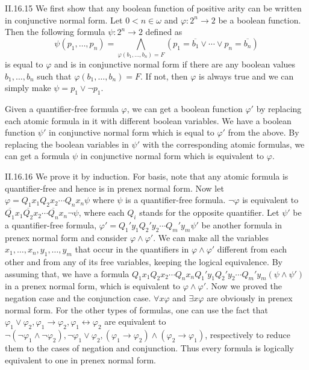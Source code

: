 \documentclass[12pt]{article}
\begin{document}
\begin{customthm}{II.16.15}
  We first show that any boolean function of positive arity can be written in conjunctive normal form. Let $0<n\in\omega$ and $\varphi:2^n\rightarrow 2$ be a boolean function. Then the following formula $\psi:2^n\rightarrow 2$ defined as
  \[
    \psi(p_1,\ldots,p_n)=\bigwedge_{\varphi(b_1,\ldots,b_n)=F}(p_1=\overline{b_1}\vee\cdots\vee p_n=\overline{b_n})
  \]
  is equal to $\varphi$ and is in conjunctive normal form if there are any boolean values $b_1,\ldots,b_n$ such that $\varphi(b_1,\ldots,b_n)=F$. If not, then $\varphi$ is always true and we can simply make $\psi=p_1\vee\neg p_1$.

  Given a quantifier-free formula $\varphi$, we can get a boolean function $\varphi'$ by replacing each atomic formula in it with different boolean variables. We have a boolean function $\psi'$ in conjunctive normal form which is equal to $\varphi'$ from the above. By replacing the boolean variables in $\psi'$ with the corresponding atomic formulas, we can get a formula $\psi$ in conjunctive normal form which is equivalent to $\varphi$.
\end{customthm}

\begin{customthm}{II.16.16}
  We prove it by induction. For basis, note that any atomic formula is quantifier-free and hence is in prenex normal form. Now let $\varphi=Q_1x_1Q_2x_2\cdots Q_nx_n\psi$ where $\psi$ is a quantifier-free formula. $\neg\varphi$ is equivalent to $\overline{Q_1}x_1\overline{Q_2}x_2\cdots\overline{Q_n}x_n\neg\psi$, where each $Q_i$ stands for the opposite quantifier. Let $\psi'$ be a quantifier-free formula, $\varphi'=Q_1'y_1Q_2'y_2\cdots Q_m'y_m\psi'$ be another formula in prenex normal form and consider $\varphi\wedge\varphi'$. We can make all the variables $x_1,\ldots,x_n,y_1,\ldots,y_m$ that occur in the quantifiers in $\varphi\wedge\varphi'$ different from each other and from any of its free variables, keeping the logical equivalence. By assuming that, we have a formula $Q_1x_1Q_2x_2\cdots Q_nx_nQ_1'y_1Q_2'y_2\cdots Q_m'y_m(\psi\wedge\psi')$ in a prenex normal form, which is equivalent to $\varphi\wedge\varphi'$. Now we proved the negation case and the conjunction case. $\forall x\varphi$ and $\exists x\varphi$ are obviously in prenex normal form. For the other types of formulas, one can use the fact that $\varphi_1\vee\varphi_2,\varphi_1\rightarrow\varphi_2,\varphi_1\leftrightarrow\varphi_2$ are equivalent to $\neg(\neg\varphi_1\wedge\neg\varphi_2), \neg\varphi_1\vee\varphi_2,(\varphi_1\rightarrow\varphi_2)\wedge(\varphi_2\rightarrow\varphi_1)$, respectively to reduce them to the cases of negation and conjunction. Thus every formula is logically equivalent to one in prenex normal form.
\end{customthm}
\end{document}
